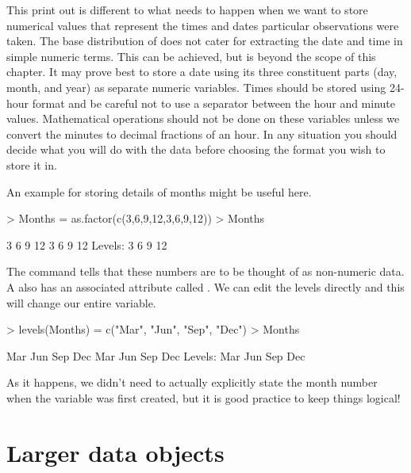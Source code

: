This print out is different to what needs to happen when we want to store numerical values that represent the times and dates particular observations were taken. The base distribution of \R{} does not cater for extracting the date and time in simple numeric terms. This can be achieved, but is beyond the scope of this chapter. It may prove best to store a date using its three constituent parts (day, month, and year) as separate numeric variables. Times should be stored using 24-hour format and be careful not to use a separator between the hour and minute values. Mathematical operations should not be done on these variables unless we convert the minutes to decimal fractions of an hour. In any situation you should decide what you will do with the data before choosing the format you wish to store it in.

An example for storing details of months might be useful here.
\begin{Schunk}
\begin{Sinput}
> Months = as.factor(c(3,6,9,12,3,6,9,12))
> Months
\end{Sinput}
\begin{Soutput}
[1] 3  6  9  12 3  6  9  12
Levels: 3 6 9 12
\end{Soutput}
\end{Schunk}
The  command tells \R{} that these numbers are to be thought of as non-numeric data. A  also has an associated attribute called . We can edit the levels directly and this will change our entire variable. \label{UseOfLevels}
\begin{Schunk}
\begin{Sinput}
> levels(Months) = c("Mar", "Jun", "Sep", "Dec")
> Months
\end{Sinput}
\begin{Soutput}
[1] Mar Jun Sep Dec Mar Jun Sep Dec
Levels: Mar Jun Sep Dec
\end{Soutput}
\end{Schunk}
As it happens, we didn't need to actually explicitly state the month number when the variable was first created, but it is good practice to keep things logical!

\section{Larger data objects}

